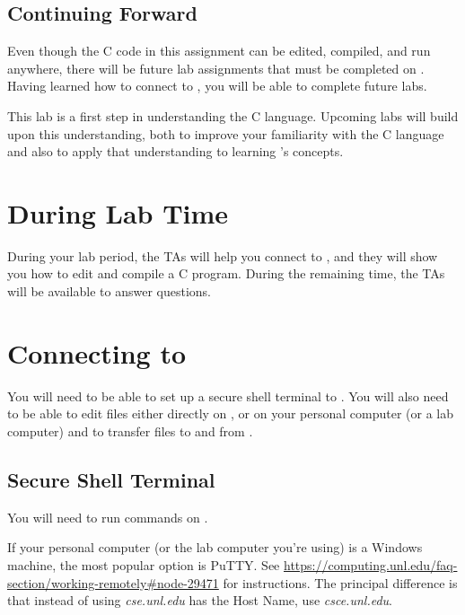 \subsection*{Continuing Forward}

Even though the C code in this assignment can be edited, compiled, and run
anywhere, there will be future lab assignments that must be completed on
\runtimeenvironment. Having learned how to connect to \runtimeenvironment, you
will be able to complete future labs.

This lab is a first step in understanding the C language. Upcoming labs will
build upon this understanding, both to improve your familiarity with the C
language and also to apply that understanding to learning \coursenumber's
concepts.

\section*{During Lab Time}

During your lab period, the TAs will help you connect to \runtimeenvironment,
and they will show you how to edit and compile a C program. During the remaining
time, the TAs will be available to answer questions.

\section{Connecting to \runtimeenvironment}


You will need to be able to set up a secure shell terminal to
\runtimeenvironment. You will also need to be able to edit files either
directly on \runtimeenvironment, or on your personal computer (or a lab
computer) and to transfer files to and from \runtimeenvironment.

\subsection{Secure Shell Terminal}

You will need to run commands on \runtimeenvironment.

If your personal computer (or the lab computer you're using) is a Windows
machine, the most popular option is PuTTY. See
\url{https://computing.unl.edu/faq-section/working-remotely#node-29471} for
instructions. The principal difference is that instead of using
\textit{cse.unl.edu} has the Host Name, use \textit{csce.unl.edu}.

